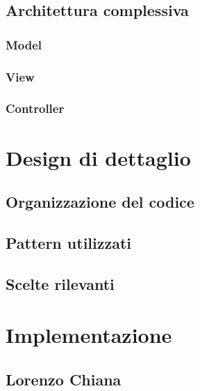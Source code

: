         \section[Architettura]{Architettura complessiva}\label{sec:architecture}
            \subsection{Model}\label{subsec:architecture:model}
                
             \subsection{View}\label{subsec:architecture:view}
                
             \subsection{Controller}\label{subsec:architecture:controller}
                

    \clearpage

    \chapter{Design di dettaglio}\label{ch:details}
        
        \section{Organizzazione del codice}\label{sec:organizations}
         
         \section{Pattern utilizzati}\label{sec:pattern}
          
        \section{Scelte rilevanti}\label{sec:choices}
           
           
    \clearpage

    \chapter{Implementazione}\label{ch:implementation}
        
        \section{Lorenzo Chiana}\label{sec:chiana}
            
    
